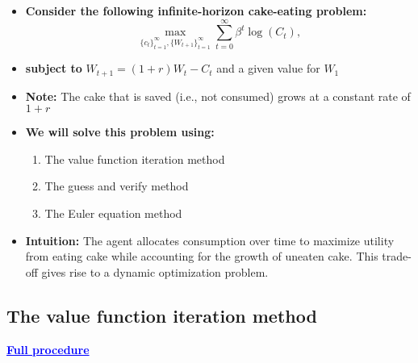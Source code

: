 \documentclass[12pt]{article}
\begin{document}
\begin{itemize}
\item \textbf{Consider the following infinite-horizon cake-eating problem:}
\[
\max_{\{c_t\}_{t=1}^{\infty}, \{W_{t+1}\}_{t=1}^{\infty}} \sum_{t=0}^{\infty} \beta^t \log(C_t),
\]

\item \textbf{subject to} \quad $W_{t+1} = (1 + r)W_t - C_t$ \quad and a given value for $W_1$

\item \textbf{Note:} The cake that is saved (i.e., not consumed) grows at a constant rate of $1 + r$

\item \textbf{We will solve this problem using:}
\begin{enumerate}
    \item The value function iteration method
    \item The guess and verify method
    \item The Euler equation method
\end{enumerate}

\item \textbf{Intuition:} The agent allocates consumption over time to maximize utility from eating cake while accounting for the growth of uneaten cake. This trade-off gives rise to a dynamic optimization problem.
\end{itemize}

\subsection*{\noindent\textbf{The value function iteration method}}

\textcolor{blue}{\textbf{\uline{Full procedure}}}
\end{document}
